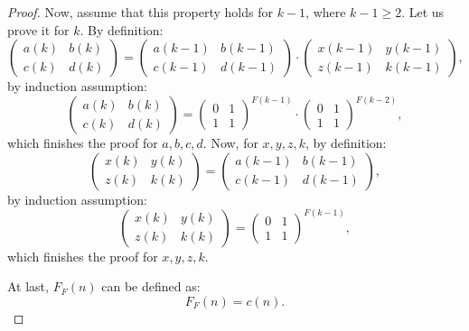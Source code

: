 \documentclass[en]{pracamgr}
\theoremstyle{definition}
\begin{document}
\begin{proof}
    Now, assume that this property holds for $k-1$, where $k-1 \geq 2$. Let us prove it for $k$. By definition:
    $$
    \begin{pmatrix}
        a(k) & b(k)\\ 
        c(k) & d(k)
    \end{pmatrix} =
    \begin{pmatrix}
        a(k-1) & b(k-1)\\ 
        c(k-1) & d(k-1)
    \end{pmatrix} 
    \cdot
    \begin{pmatrix}
        x(k-1) & y(k-1)\\ 
        z(k-1) & k(k-1)
    \end{pmatrix},
    $$
    by induction assumption:
    $$
    \begin{pmatrix}
        a(k) & b(k)\\ 
        c(k) & d(k)
    \end{pmatrix} =
    \begin{pmatrix}
        0 & 1\\ 
        1 & 1
    \end{pmatrix}^{F(k-1)}
    \cdot
    \begin{pmatrix}
        0 & 1\\ 
        1 & 1
    \end{pmatrix}^{F(k-2)},
    $$
    which finishes the proof for $a,b,c,d$. Now, for $x,y,z,k$, by definition:
    $$
    \begin{pmatrix}
        x(k) & y(k)\\ 
        z(k) & k(k)
    \end{pmatrix} =
    \begin{pmatrix}
        a(k-1) & b(k-1)\\ 
        c(k-1) & d(k-1)
    \end{pmatrix},
    $$
    by induction assumption:
    $$
    \begin{pmatrix}
        x(k) & y(k)\\ 
        z(k) & k(k)
    \end{pmatrix} =
    \begin{pmatrix}
        0 & 1\\ 
        1 & 1
    \end{pmatrix}^{F(k-1)},
    $$
    which finishes the proof for $x,y,z,k$.

    At last, $F_F(n)$ can be defined as:
    $$F_F(n) = c(n).$$
\end{proof}
\end{document}

